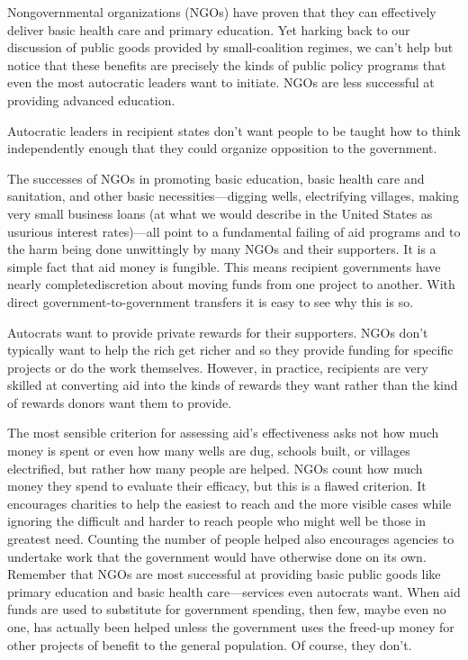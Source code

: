 \documentclass[10pt]{article}
\begin{document}
{\large Nongovernmental organizations (NGOs) have proven that they can
effectively deliver basic health care and primary education. Yet harking back to
our discussion of public goods provided by small-coalition regimes, we can't help
but notice that these benefits are precisely the kinds of public policy programs
that even the most autocratic leaders want to initiate. NGOs are less successful
at providing advanced education.}

{\large Autocratic leaders in recipient states don't want people to be taught
how to think independently enough that they could organize opposition to the
government.}

{\large The successes of NGOs in promoting basic education, basic health care
and sanitation, and other basic necessities---digging wells, electrifying
villages, making very small business loans (at what we would describe in the
United States as usurious interest rates)---all point to a fundamental failing of
aid programs and to the harm being done unwittingly by many NGOs and their
supporters. It is a simple fact that aid money is fungible. This means recipient
governments have nearly completediscretion about moving funds from one project to
another. With direct government-to-government transfers it is easy to see why
this is so.}

{\large Autocrats want to provide private rewards for their supporters. NGOs
don't typically want to help the rich get richer and so they provide funding for
specific projects or do the work themselves. However, in practice, recipients are
very skilled at converting aid into the kinds of rewards they want rather than
the kind of rewards donors want them to provide.}

{\large The most sensible criterion for assessing aid's effectiveness asks not
how much money is spent or even how many wells are dug, schools built, or
villages electrified, but rather how many people are helped. NGOs count how much
money they spend to evaluate their efficacy, but this is a flawed criterion. It
encourages charities to help the easiest to reach and the more visible cases
while ignoring the difficult and harder to reach people who might well be those
in greatest need. Counting the number of people helped also encourages agencies
to undertake work that the government would have otherwise done on its own.
Remember that NGOs are most successful at providing basic public goods like
primary education and basic health care---services even autocrats want. When aid
funds are used to substitute for government spending, then few, maybe even no
one, has actually been helped unless the government uses the freed-up money for
other projects of benefit to the general population. Of course, they don't.}
\end{document}
